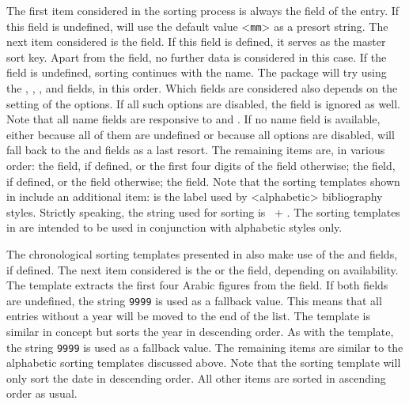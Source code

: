 \documentclass{ltxdockit}[2011/03/25]
\newcommand*{\biblatex}{\sty{biblatex}\xspace}
\begin{document}
The first item considered in the sorting process is always the  field of the entry. If this field is undefined, \biblatex will use the default value <\texttt{mm}> as a presort string. The next item considered is the  field. If this field is defined, it serves as the master sort key. Apart from the  field, no further data is considered in this case. If the  field is undefined, sorting continues with the name. The package will try using the , , , and  fields, in this order. Which fields are considered also depends on the setting of the  options. If all such options are disabled, the  field is ignored as well. Note that all name fields are responsive to  and . If no name field is available, either because all of them are undefined or because all  options are disabled, \biblatex will fall back to the  and  fields as a last resort. The remaining items are, in various order: the  field, if defined, or the first four digits of the  field otherwise; the  field, if defined, or the  field otherwise; the  field. Note that the sorting templates shown in  include an additional item:  is the label used by <alphabetic> bibliography styles. Strictly speaking, the string used for sorting is ~+ . The sorting templates in  are intended to be used in conjunction with alphabetic styles only.

The chronological sorting templates presented in  also make use of the  and  fields, if defined. The next item considered is the  or the  field, depending on availability. The  template extracts the first four Arabic figures from the field. If both fields are undefined, the string \texttt{9999} is used as a fallback value. This means that all entries without a year will be moved to the end of the list. The  template is similar in concept but sorts the year in descending order. As with the  template, the string \texttt{9999} is used as a fallback value. The remaining items are similar to the alphabetic sorting templates discussed above. Note that the  sorting template will only sort the date in descending order. All other items are sorted in ascending order as usual.
\end{document}
